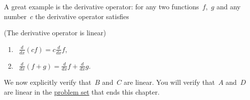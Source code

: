 \noindent
A great example is the derivative operator: for any two functions~$f$,~$g$ and any number~$c$ the derivative operator satisfies\\[-.5cm]
\begin{example} (The derivative operator is linear)\\
\begin{enumerate}
\item ~$\frac{d}{dx} (cf)=c\frac{d}{dx} f$, \\[-.5cm]
\item~$\frac{d}{dx}(f+g)=\frac{d}{dx}f+\frac{d}{dx}g$.\\[-.5cm]
\end{enumerate}
\end{example}
\noindent
We now explicitly verify that~$B$ and~$C$ are linear. You will verify that~$A$ and~$D$ are linear in the \hyperlink{ch1probset}{problem set} that ends this chapter.  \\

